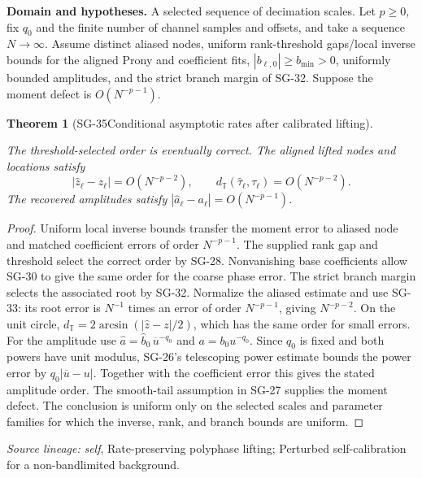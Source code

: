 \documentclass[11pt]{article}
\newtheorem{theorem}{Theorem}[section]
\theoremstyle{definition}\newtheorem{definition}[theorem]{Definition}
\theoremstyle{remark}\newtheorem{remark}[theorem]{Remark}
\begin{document}
\par{\small\textbf{Domain and hypotheses.} A selected sequence of decimation scales. Let $p\ge0$, fix $q_0$ and the finite number of channel samples and offsets, and take a sequence $N\to\infty$. Assume distinct aliased nodes, uniform rank-threshold gaps/local inverse bounds for the aligned Prony and coefficient fits, $|b_{\ell,0}|\ge b_{\min}>0$, uniformly bounded amplitudes, and the strict branch margin of SG-32. Suppose the moment defect is $O(N^{-p-1})$.}\par
\begin{theorem}[SG-35\quad Conditional asymptotic rates after calibrated lifting]\label{SG-35}

The threshold-selected order is eventually correct. The aligned lifted nodes
and locations satisfy
\[
 |\widehat z_\ell-z_\ell|=O(N^{-p-2}),\qquad
 d_{\mathbb T}(\widehat\tau_\ell,\tau_\ell)=O(N^{-p-2}).
\]
The recovered amplitudes satisfy
$|\widehat a_\ell-a_\ell|=O(N^{-p-1})$.

\end{theorem}
\begin{proof}

Uniform local inverse bounds transfer the moment error to aliased node and
matched coefficient errors of order $N^{-p-1}$. The supplied rank gap and
threshold select the correct order by SG-28. Nonvanishing base coefficients
allow SG-30 to give the same order for the coarse phase error.
The strict branch margin selects the associated root by SG-32. Normalize the
aliased estimate and use SG-33: its root error is $N^{-1}$ times an error of
order $N^{-p-1}$, giving $N^{-p-2}$. On the unit circle,
$d_{\mathbb T}=2\arcsin(|\widehat z-z|/2)$, which has the same order for
small errors. For the amplitude use
$\widehat a=\widehat b_0\,\overline u^{-q_0}$ and $a=b_0u^{-q_0}$.
Since $q_0$ is fixed and both powers have unit modulus, SG-26's telescoping
power estimate bounds the power error by $q_0|\overline u-u|$.
Together with the coefficient error this gives the stated amplitude order.
The smooth-tail assumption in SG-27 supplies the moment defect.
The conclusion is uniform only on the selected scales and parameter families
for which the inverse, rank, and branch bounds are uniform.

\end{proof}

\par{\small\color{Teal}\textit{Source lineage:} \textit{self}, Rate-preserving polyphase lifting; Perturbed self-calibration for a non-bandlimited background.}\par
\end{document}
